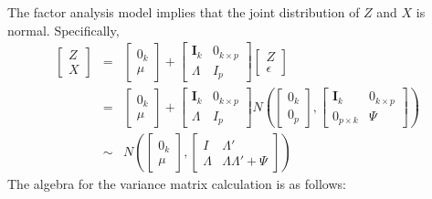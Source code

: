 \documentclass[12pt]{article}
\theoremstyle{definition}
\begin{document}
The factor analysis model implies that the joint distribution of $Z$ and $X$ is normal. Specifically,
\begin{eqnarray*}
	\left[\begin{array}{c}
	Z\\ X
	\end{array}\right] &=& 
		\left[\begin{array}{c}
	0_k\\ \mu
	\end{array}\right] + \left[\begin{array}{cc}
		\mathbf{I}_k & 0_{k\times p} \\ \Lambda & I_{p}
	\end{array}\right]\left[\begin{array}{c}
		Z \\ \epsilon
	\end{array} \right]\\
	& = & \left[\begin{array}{c}
	0_k\\ \mu
	\end{array}\right] + \left[\begin{array}{cc}
		\mathbf{I}_k & 0_{k\times p} \\ \Lambda & I_{p}
	\end{array}\right]
	N\left(\left[\begin{array}{c}
		0_k \\ 0_p
	\end{array} \right], \left[\begin{array}{cc}
		\mathbf{I}_k & 0_{k\times p} \\ 0_{p\times k} & \Psi
	\end{array}\right]\right)\\
	&\sim & N\left(\left[\begin{array}{c}
	0_k \\ \mu
	\end{array}\right], \left[\begin{array}{cc}
		I & \Lambda'\\
		\Lambda & \Lambda \Lambda' + \Psi
	\end{array} \right] \right)
\end{eqnarray*}
The algebra for the variance matrix calculation is as follows:
\end{document}
